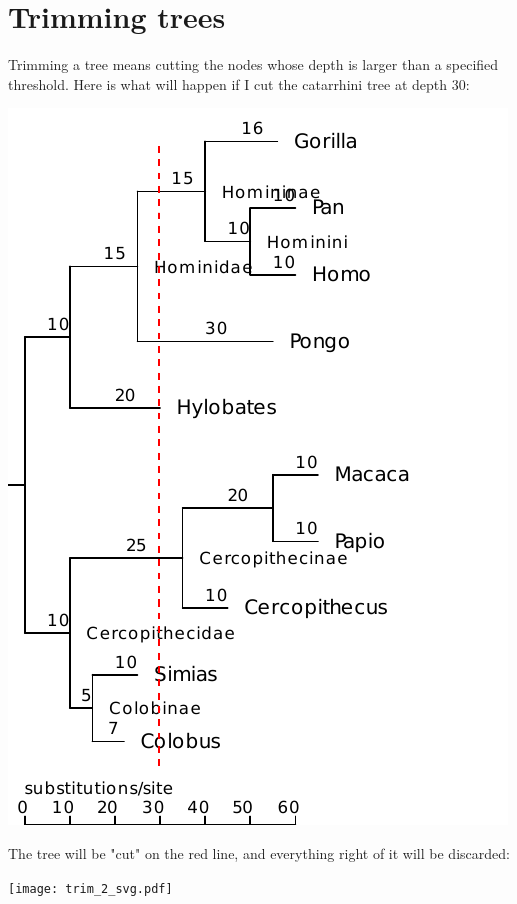 \section{Trimming trees}
\label{sct_trim}

Trimming a tree means cutting the nodes whose depth is larger than a specified threshold. Here is what will happen if I cut the catarrhini tree at depth 30:

\begin{center}
\includegraphics{trim_1.pdf}
\end{center}

\noindent{}The tree will be "cut" on the red line, and everything right of it will be discarded:


\begin{center}
\texttt{[image: trim\_2\_svg.pdf]}
\end{center}

